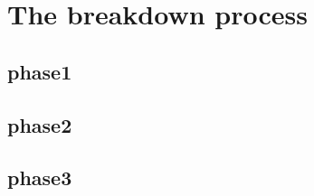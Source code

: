 \chapter[The breakdown process]{The breakdown process}

\section[phase1]{phase1}

\section[phase2]{phase2}

\section[phase3]{phase3}
